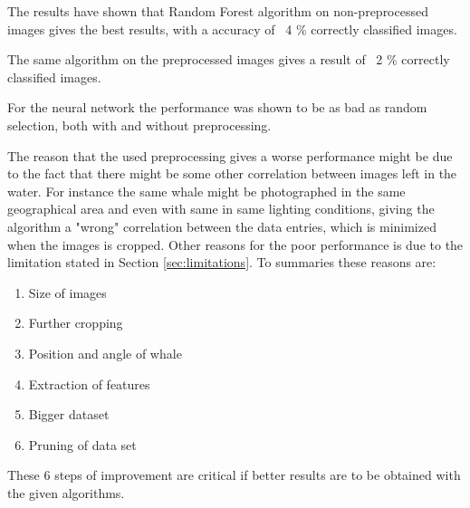 
The results have shown that Random Forest algorithm on non-preprocessed images gives the best results, with a accuracy of ~4 \% correctly classified images.

The same algorithm on the preprocessed images gives a result of ~2 \% correctly classified images.

For the neural network the performance was shown to be as bad as random selection, both with and without preprocessing.

The reason that the used preprocessing gives a worse performance might be due to the fact that there might be some other correlation between images left in the water. For instance the same whale might be photographed in the same geographical area and even with same in same lighting conditions, giving the algorithm a "wrong"  correlation between the data entries, which is minimized when the images is cropped.
Other reasons for the poor performance is due to the limitation stated in Section \ref{sec:limitations}.
To summaries these reasons are:
\begin{enumerate}
\item Size of images 
\item Further cropping
\item Position and angle of whale
\item Extraction of features
\item Bigger dataset
\item Pruning of data set
\end{enumerate}
These 6 steps of improvement are critical if better results are to be obtained with the given algorithms. 

